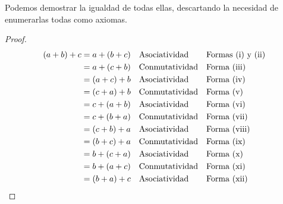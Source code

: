 \documentclass[11pt]{article}
\begin{document}
Podemos demostrar la igualdad de todas ellas, descartando la necesidad de enumerarlas todas como axiomas.
%
\vspace{-1em}\begin{proof} \begin{align*}
    (a+b)+c &= a+(b+c) && \text{Asociatividad} && \text{Formas (i) y (ii)}\\
    &= a+(c+b) && \text{Conmutatividad} && \text{Forma (iii)}\\
    &= (a+c)+b && \text{Asociatividad} && \text{Forma (iv)}\\
    &= (c+a)+b && \text{Conmutatividad}&& \text{Forma (v)}\\
    &= c+(a+b) && \text{Asociatividad}&& \text{Forma (vi)}\\
    &= c+(b+a) && \text{Conmutatividad}&& \text{Forma (vii)}\\
    &= (c+b)+a && \text{Asociatividad}&& \text{Forma (viii)}\\
    &= (b+c)+a && \text{Conmutatividad}&& \text{Forma (ix)}\\
    &= b+(c+a) && \text{Asociatividad}&& \text{Forma (x)}\\
    &= b+(a+c) && \text{Conmutatividad}&& \text{Forma (xi)}\\
    &= (b+a)+c && \text{Asociatividad}&& \text{Forma (xii)} \qedhere
\end{align*} \end{proof} \vspace{-1em}
\end{document}

